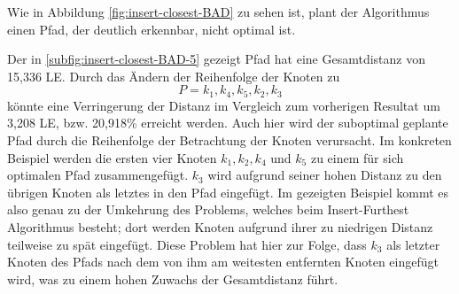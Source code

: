 Wie in Abbildung \vref{fig:insert-closest-BAD} zu sehen ist, plant der Algorithmus einen Pfad, der deutlich erkennbar, nicht optimal ist.

Der in \vref{subfig:insert-closest-BAD-5} gezeigt Pfad hat eine Gesamtdistanz von 15,336 \ac{LE}.
Durch das Ändern der Reihenfolge der Knoten zu
    $$P=k_1, k_4, k_5, k_2, k_3$$ 
könnte eine Verringerung der Distanz im Vergleich zum vorherigen Resultat um 3,208 \ac{LE}, bzw. 20,918\% erreicht werden.
Auch hier wird der suboptimal geplante Pfad durch die Reihenfolge der Betrachtung der Knoten verursacht.
Im konkreten Beispiel werden die ersten vier Knoten $k_1, k_2, k_4$ und $k_5$ zu einem für sich optimalen Pfad zusammengefügt.
$k_3$ wird aufgrund seiner hohen Distanz zu den übrigen Knoten als letztes in den Pfad eingefügt.
Im gezeigten Beispiel kommt es also genau zu der Umkehrung des Problems, welches beim Insert-Furthest Algorithmus besteht; dort werden Knoten aufgrund ihrer zu niedrigen Distanz teilweise zu spät eingefügt.
Diese Problem hat hier zur Folge, dass $k_3$ als letzter Knoten des Pfads nach dem von ihm am weitesten entfernten Knoten eingefügt wird, was zu einem hohen Zuwachs der Gesamtdistanz führt.